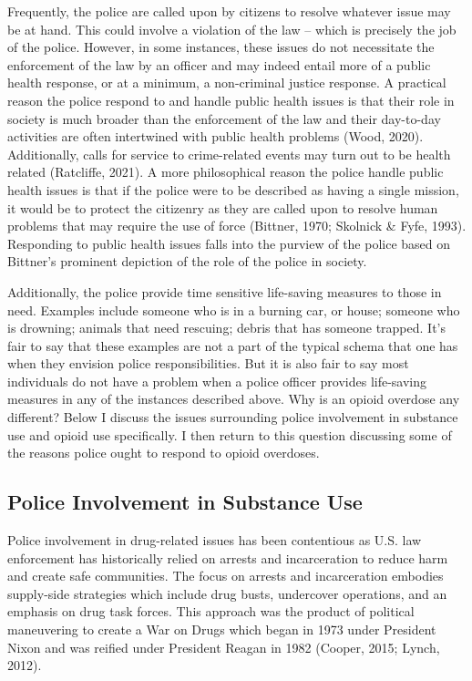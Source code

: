 Frequently, the police are called upon by citizens to resolve whatever issue may be at hand. This could involve a violation of the law – which is precisely the job of the police. However, in some instances, these issues do not necessitate the enforcement of the law by an officer and may indeed entail more of a public health response, or at a minimum, a non-criminal justice response. A practical reason the police respond to and handle public health issues is that their role in society is much broader than the enforcement of the law and their day-to-day activities are often intertwined with public health problems (Wood, 2020). Additionally, calls for service to crime-related events may turn out to be health related (Ratcliffe, 2021). A more philosophical reason the police handle public health issues is that if the police were to be described as having a single mission, it would be to protect the citizenry as they are called upon to resolve human problems that may require the use of force (Bittner, 1970; Skolnick & Fyfe, 1993). Responding to public health issues falls into the purview of the police based on Bittner’s prominent depiction of the role of the police in society.

Additionally, the police provide time sensitive life-saving measures to those in need. Examples include someone who is in a burning car, or house; someone who is drowning; animals that need rescuing; debris that has someone trapped. It's fair to say that these examples are not a part of the typical schema that one has when they envision police responsibilities. But it is also fair to say most individuals do not have a problem when a police officer provides life-saving measures in any of the instances described above. Why is an opioid overdose any different? Below I discuss the issues surrounding police involvement in substance use and opioid use specifically. I then return to this question discussing some of the reasons police ought to respond to opioid overdoses. 
 
\subsection{Police Involvement in Substance Use}

Police involvement in drug-related issues has been contentious as U.S. law enforcement has historically relied on arrests and incarceration to reduce harm and create safe communities. The focus on arrests and incarceration embodies supply-side strategies which include drug busts, undercover operations, and an emphasis on drug task forces. This approach was the product of political maneuvering to create a War on Drugs which began in 1973 under President Nixon and was reified under President Reagan in 1982 (Cooper, 2015; Lynch, 2012).

